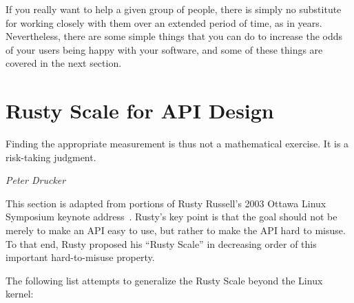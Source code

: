 If you really want to help a given group of people, there is simply no
substitute for working closely with them over an extended period of time,
as in years.
Nevertheless, there are some simple things that you can do to increase
the odds of your users being happy with your software, and some of these
things are covered in the next section.

\section{Rusty Scale for API Design}
\label{sec:easy:Rusty Scale for API Design}
%
\epigraph{Finding the appropriate measurement is thus not a mathematical
	  exercise.  It is a risk-taking judgment.}
	 {\emph{Peter Drucker}}

This section is adapted from portions of Rusty Russell's 2003 Ottawa Linux
Symposium keynote address~\cite[Slides~39--57]{RustyRussell2003OLSkeynote}.
Rusty's key point is that the goal should not be merely to make an API
easy to use, but rather to make the API hard to misuse.
To that end, Rusty proposed his ``Rusty Scale'' in decreasing order
of this important hard-to-misuse property.

The following list attempts to generalize the Rusty Scale beyond the
Linux kernel:


